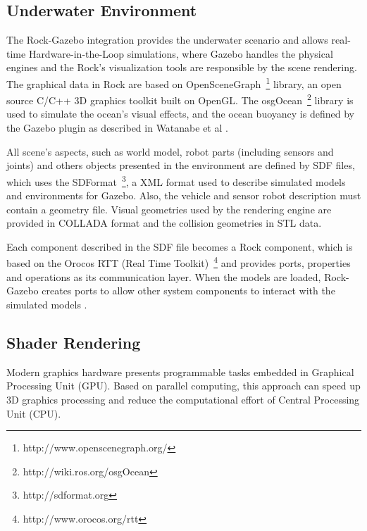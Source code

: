 \documentclass[final,5p,times]{elsarticle}
\begin{document}

\subsection{Underwater Environment}
\label{dev:uwscene}

The Rock-Gazebo integration \cite{watanabe2015} provides the underwater scenario and allows real-time Hardware-in-the-Loop simulations, where Gazebo handles the physical engines and the Rock's visualization tools are responsible by the scene rendering. The graphical data in Rock are based on OpenSceneGraph~\footnote{http://www.openscenegraph.org/} library, an open source C/C++ 3D graphics toolkit built on OpenGL. The osgOcean~\footnote{http://wiki.ros.org/osgOcean} library is used to simulate the ocean's visual effects, and the ocean buoyancy is defined by the Gazebo plugin as described in Watanabe et al \cite{watanabe2015}.

All scene's aspects, such as world model, robot parts (including sensors and joints) and others objects presented in the environment are defined by SDF files, which uses the SDFormat~\footnote{http://sdformat.org}, a XML format used to describe simulated models and environments for Gazebo. Also, the vehicle and sensor robot description must contain a geometry file. Visual geometries used by the rendering engine are provided in COLLADA format and the collision geometries in STL data.

Each component described in the SDF file becomes a Rock component, which is based on the Orocos RTT (Real Time Toolkit)~\footnote{http://www.orocos.org/rtt} and provides ports, properties and operations as its communication layer. When the models are loaded, Rock-Gazebo creates ports to allow other system components to interact with the simulated models \cite{cerqueira2016}.


\subsection{Shader Rendering}
\label{dev:shader}

Modern graphics hardware presents programmable tasks embedded in Graphical Processing Unit (GPU). Based on parallel computing, this approach can speed up 3D graphics processing and reduce the computational effort of Central Processing Unit (CPU).
\end{document}
